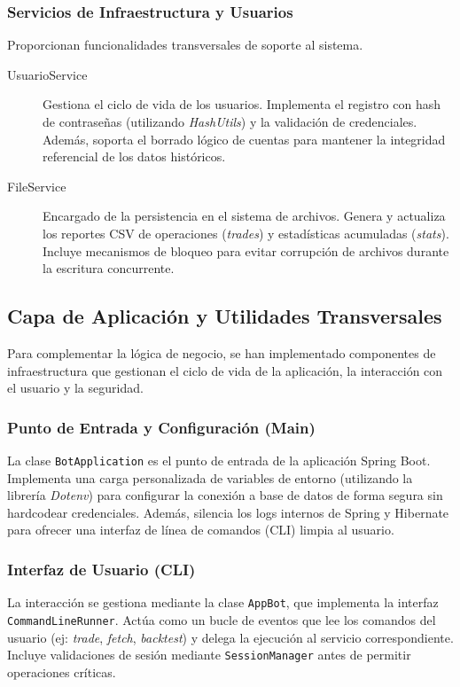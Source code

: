 \documentclass[12pt, letterpaper]{article}
\begin{document}
\subsubsection{Servicios de Infraestructura y Usuarios}
Proporcionan funcionalidades transversales de soporte al sistema.

\begin{description}
    \item[UsuarioService] Gestiona el ciclo de vida de los usuarios. Implementa el registro con hash de contraseñas (utilizando \textit{HashUtils}) y la validación de credenciales. Además, soporta el borrado lógico de cuentas para mantener la integridad referencial de los datos históricos.

    \item[FileService] Encargado de la persistencia en el sistema de archivos. Genera y actualiza los reportes CSV de operaciones (\textit{trades}) y estadísticas acumuladas (\textit{stats}). Incluye mecanismos de bloqueo para evitar corrupción de archivos durante la escritura concurrente.
\end{description}

\subsection{Capa de Aplicación y Utilidades Transversales}

Para complementar la lógica de negocio, se han implementado componentes de infraestructura que gestionan el ciclo de vida de la aplicación, la interacción con el usuario y la seguridad.

\subsubsection{Punto de Entrada y Configuración (Main)}
La clase \texttt{BotApplication} es el punto de entrada de la aplicación Spring Boot. Implementa una carga personalizada de variables de entorno (utilizando la librería \textit{Dotenv}) para configurar la conexión a base de datos de forma segura sin hardcodear credenciales. Además, silencia los logs internos de Spring y Hibernate para ofrecer una interfaz de línea de comandos (CLI) limpia al usuario.

\subsubsection{Interfaz de Usuario (CLI)}
La interacción se gestiona mediante la clase \texttt{AppBot}, que implementa la interfaz \texttt{CommandLineRunner}. Actúa como un bucle de eventos que lee los comandos del usuario (ej: \textit{trade}, \textit{fetch}, \textit{backtest}) y delega la ejecución al servicio correspondiente. Incluye validaciones de sesión mediante \texttt{SessionManager} antes de permitir operaciones críticas.
\end{document}
